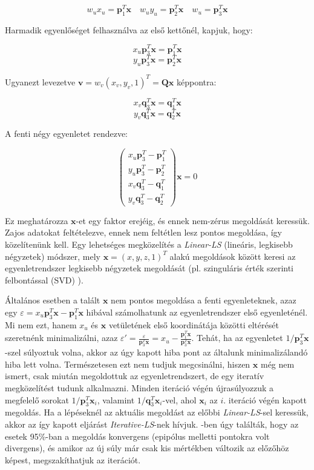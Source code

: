 \[w_ux_u = \mathbf{p}_1^T\mathbf{x} \quad w_uy_u = \mathbf{p}_2^T\mathbf{x} \quad w_u = \mathbf{p}_3^T\mathbf{x}\]

Harmadik egyenlőséget felhasználva az első kettőnél, kapjuk, hogy:

\[x_u\mathbf{p}_3^T\mathbf{x} = \mathbf{p}_1^T\mathbf{x}\]
\[y_u\mathbf{p}_3^T\mathbf{x} = \mathbf{p}_2^T\mathbf{x}\]

Ugyanezt levezetve $\mathbf{v} = w_v(x_v, y_v, 1)^T = \mathbf{Q}\mathbf{x}$ képpontra:

\[x_v\mathbf{q}_3^T\mathbf{x} = \mathbf{q}_1^T\mathbf{x}\]
\[y_v\mathbf{q}_3^T\mathbf{x} = \mathbf{q}_2^T\mathbf{x}\]

A fenti négy egyenletet rendezve:

\[\left( \begin{array}{c} x_u\mathbf{p}_3^T - \mathbf{p}_1^T \\ y_u\mathbf{p}_3^T - \mathbf{p}_2^T \\ x_v\mathbf{q}_3^T - \mathbf{q}_1^T \\ y_v\mathbf{q}_3^T - \mathbf{q}_2^T \end{array} \right) \mathbf{x} = 0\]

Ez meghatározza $\mathbf{x}$-et egy faktor erejéig, és ennek nem-zérus megoldását keressük. Zajos adatokat feltételezve, ennek nem feltétlen lesz pontos megoldása, így közelítenünk kell. Egy lehetséges megközelítés a \textit{Linear-LS} (lineáris, legkisebb négyzetek) módszer, mely $\mathbf{x} = (x, y, z, 1)^T$ alakú megoldások között keresi az egyenletrendszer legkisebb négyzetek megoldását (pl. szinguláris érték szerinti felbontással (SVD) \cite{cs-svd}). 

Általános esetben a talált $\mathbf{x}$ nem pontos megoldása a fenti egyenleteknek, azaz egy $\varepsilon = x_u\mathbf{p}_3^T\mathbf{x} - \mathbf{p}_1^T\mathbf{x}$ hibával számolhatunk az egyenletrendszer első egyenleténél. Mi nem ezt, hanem $x_u$ és $\mathbf{x}$ vetületének első koordinátája közötti eltérését szeretnénk minimalizálni, azaz $\varepsilon' = \frac{\varepsilon}{\mathbf{p}_3^T\mathbf{x}} = x_u - \frac{\mathbf{p}_1^T\mathbf{x}}{\mathbf{p}_3^T\mathbf{x}}$. Tehát, ha az egyenletet $1 / \mathbf{p}_3^T\mathbf{x}$-szel súlyoztuk volna, akkor az úgy kapott hiba pont az általunk minimalizálandó hiba lett volna. Természetesen ezt nem tudjuk megcsinálni, hiszen $\mathbf{x}$ még nem ismert, csak miután megoldottuk az egyenletrendszert, de egy iteratív megközelítést tudunk alkalmazni. Minden iteráció végén újrasúlyozzuk a megfelelő sorokat $1 / \mathbf{p}_3^T\mathbf{x}_i$, valamint $1 / \mathbf{q}_3^T\mathbf{x}_i$-vel, ahol $\mathbf{x}_i$ az $i$. iteráció végén kapott megoldás. Ha a lépéseknél az aktuális megoldást az előbbi \textit{Linear-LS}-sel keressük, akkor az így kapott eljárást \textit{Iterative-LS}-nek hívjuk. \cite[5.2 szekció]{hartley-triangulation}-ben úgy találták, hogy az esetek 95\%-ban a megoldás konvergens (epipólus melletti pontokra volt divergens), és amikor az új súly már csak kis mértékben változik az előzőhöz képest, megszakíthatjuk az iterációt.

